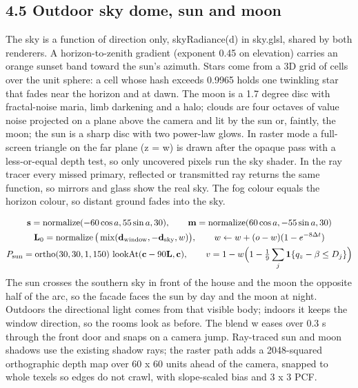 \documentclass[12pt,a4paper]{article}
\begin{document}
\subsection*{4.5 Outdoor sky dome, sun and moon}
The sky is a function of direction only, skyRadiance(d) in sky.glsl, shared by both renderers. A horizon-to-zenith gradient (exponent 0.45 on elevation) carries an orange sunset band toward the sun's azimuth. Stars come from a 3D grid of cells over the unit sphere: a cell whose hash exceeds 0.9965 holds one twinkling star that fades near the horizon and at dawn. The moon is a 1.7 degree disc with fractal-noise maria, limb darkening and a halo; clouds are four octaves of value noise projected on a plane above the camera and lit by the sun or, faintly, the moon; the sun is a sharp disc with two power-law glows. In raster mode a full-screen triangle on the far plane (z = w) is drawn after the opaque pass with a less-or-equal depth test, so only uncovered pixels run the sky shader. In the ray tracer every missed primary, reflected or transmitted ray returns the same function, so mirrors and glass show the real sky. The fog colour equals the horizon colour, so distant ground fades into the sky.

{\small\begin{equation}\begin{gathered}
\mathbf s=\operatorname{normalize}(-60\cos a,55\sin a,30),\qquad\mathbf m=\operatorname{normalize}(60\cos a,-55\sin a,30)\\
\mathbf L_0=\operatorname{normalize}\big(\operatorname{mix}(\mathbf d_{\rm window},-\mathbf d_{\rm sky},w)\big),\qquad w\leftarrow w+(o-w)(1-e^{-8\Delta t})\\
P_{\rm sun}=\operatorname{ortho}(30,30,1,150)\,\operatorname{lookAt}(\mathbf c-90\mathbf L,\mathbf c),\qquad v=1-w\Big(1-\tfrac19\sum_j\mathbf 1\{q_z-\beta\le D_j\}\Big)
\end{gathered}\label{eq:27}\end{equation}}
The sun crosses the southern sky in front of the house and the moon the opposite half of the arc, so the facade faces the sun by day and the moon at night. Outdoors the directional light comes from that visible body; indoors it keeps the window direction, so the rooms look as before. The blend w eases over 0.3 s through the front door and snaps on a camera jump. Ray-traced sun and moon shadows use the existing shadow rays; the raster path adds a 2048-squared orthographic depth map over 60 x 60 units ahead of the camera, snapped to whole texels so edges do not crawl, with slope-scaled bias and 3 x 3 PCF.
\end{document}
